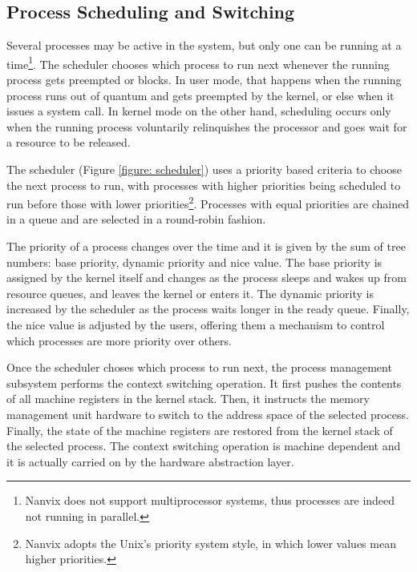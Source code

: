 \documentclass[10pt,a4paper]{article}
\begin{document}
\subsection{Process Scheduling and Switching}

Several processes may be active in the system, but only one can be running at a time\footnote{Nanvix does not support multiprocessor systems, thus processes are indeed not running in parallel.}. The scheduler chooses which process to run next whenever the running process gets preempted or blocks. In user mode, that happens when the running process runs out of quantum and gets preempted by the kernel, or else when it issues a system call. In kernel mode on the other hand, scheduling occurs only when the running process voluntarily relinquishes the processor and goes wait for a resource to be released.

The scheduler (Figure \ref{figure: scheduler}) uses a priority based criteria to choose the next process to run, with processes with higher priorities being scheduled to run before those with lower priorities\footnote{Nanvix adopts the Unix's priority system style, in which lower values mean higher priorities.}. Processes with equal priorities are chained in a queue and are selected in a round-robin fashion.

The priority of a process changes over the time and it is given by the sum of tree numbers: base priority, dynamic priority and nice value. The base priority is assigned by the kernel itself and changes as the process sleeps and wakes up from resource queues, and leaves the kernel or enters it. The dynamic priority is increased by the scheduler as the process waits longer in the ready queue. Finally, the nice value is adjusted by the users, offering them a mechanism to control which processes are more priority over others.

Once the scheduler choses which process to run next, the process management subsystem performs the context switching operation. It first pushes the contents of all machine registers in the kernel stack. Then, it instructs the memory management unit hardware to switch to the address space of the selected process. Finally, the state of the machine registers are restored from the kernel stack of the selected process. The context switching operation is machine dependent and it is actually carried on by the hardware abstraction layer.
\end{document}
